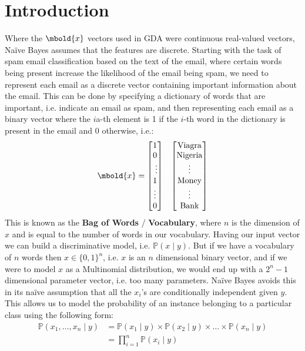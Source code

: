 \documentclass[12pt letter]{report}
\begin{document}
\section{Introduction}
Where the $\mbold{x}$ vectors used in GDA were continuous real-valued vectors, Naïve Bayes assumes that the features are
discrete. Starting with the task of spam email classification based on the text of the email, where certain words being present
increase the likelihood of the email being spam, we need to represent each email as a discrete vector containing
important information about the email. This can be done by specifying a dictionary of words that are important, i.e.
indicate an email as spam, and then representing each email as a binary vector where the $i$a-th element is 1 if the
$i$-th word in the dictionary is present in the email and 0 otherwise, i.e.:
\begin{align*}
  \begin{array}{c c}
    \mbold{x} = \begin{bmatrix} 1 \\  0 \\ \ \vdots\\  1\\  \vdots \\ 0 \end{bmatrix} &
    \begin{bmatrix} \text{Viagra} \\ \text{Nigeria} \\ \vdots \\ \text{Money} \\ \vdots \\ \text{Bank} \end{bmatrix}
  \end{array}
\end{align*}
This is known as the \textbf{Bag of Words} / \textbf{Vocabulary}, where $n$ is the dimension of $x$ and is equal to the
number of words in our vocabulary. Having our input vector we can build a discriminative model, i.e. $\mathbb{P} \left(
  x  \mid y\right) $. But if we have a vocabulary of $n$ words then $x \in \{0, 1\}^{n} $, i.e. $x$ is an $n$
dimensional binary vector, and if we were to model $x$ as a Multinomial distribution, we would end up with a $2^{n} -
  1$ dimensional parameter vector, i.e. too many parameters. Naïve Bayes avoids this in its naïve assumption that all
the $x_i$'s are conditionally independent given $y$. This allows us to model the probability of an instance belonging
to a particular class using the following form:
\begin{align*}
  \mathbb{P} \left( x_1, \ldots, x_n  \mid y \right) & = \mathbb{P} \left( x_1  \mid y \right) \times \mathbb{P} \left(
  x_2  \mid y \right) \times \ldots \times \mathbb{P} \left( x_n  \mid y \right)                                        \\
                                                     & = \prod_{i=1}^{n} \mathbb{P} \left( x_i  \mid y \right)          \\
\end{align*}
\end{document}
